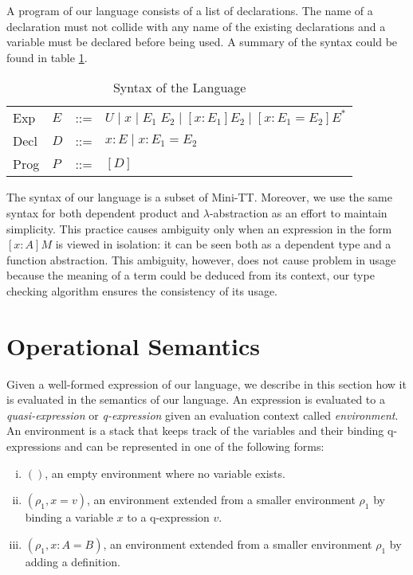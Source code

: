 A program of our language consists of a list of declarations. The name of a declaration must not collide with any name of the existing declarations and a variable must be declared before being used. A summary of the syntax could be found in table \ref{theory:tab:syntax}.
\begin{table}[h]
  \centering
  \begin{tabular}{l l l l}
    Exp  & $E$ & ::= & $U \mid x \mid E_1\;E_2 \mid [x : E_1]E_2 \mid [x : E_1 = E_2]E^{*}$ \\
    Decl & $D$ & ::= & $x : E \mid x : E_1 = E_2$ \\
    Prog & $P$ & ::= & $[D]$
  \end{tabular}
  \caption{Syntax of the Language}
  \label{theory:tab:syntax}
\end{table}

The syntax of our language is a subset of Mini-TT\cite{coquand2009simple}. Moreover, we use the same syntax for both dependent product and $\lambda$-abstraction as an effort to maintain simplicity. This practice causes ambiguity only when an expression in the form $[x : A] M$ is viewed in isolation: it can be seen both as a dependent type and a function abstraction. This ambiguity, however, does not cause problem in usage because the meaning of a term could be deduced from its context, our type checking algorithm ensures the consistency of its usage.

\section{Operational Semantics}
Given a well-formed expression of our language, we describe in this section how it is evaluated in the semantics of our language. An expression is evaluated to a \emph{quasi-expression} or \emph{q-expression} given an evaluation context called \emph{environment}. An environment is a stack that keeps track of the variables and their binding q-expressions and can be represented in one of the following forms: 
\begin{definition}[Environment]
  \leavevmode \vspace{-\baselineskip}
  \begin{enumerate}[(i)]
  \item $()$, an empty environment where no variable exists.
  \item $(\rho_1, x = v)$, an environment extended from a smaller environment $\rho_1$ by binding a variable $x$ to a q-expression $v$.
  \item $(\rho_1, x : A = B)$, an environment extended from a smaller environment $\rho_1$ by adding a definition.
  \end{enumerate}
\end{definition}

